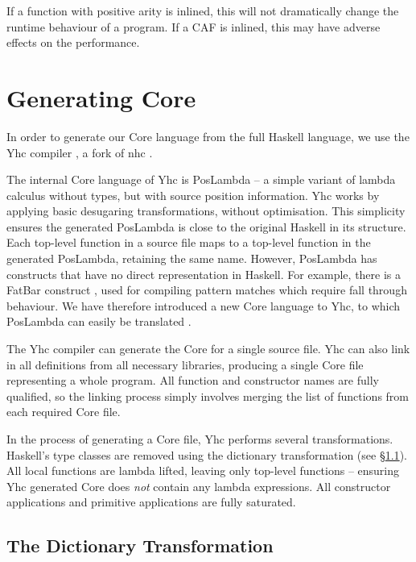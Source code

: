If a function with positive arity is inlined, this will not dramatically change the runtime behaviour of a program. If a CAF is inlined, this may have adverse effects on the performance.


\section{Generating Core}
\label{secB:generating_core}

In order to generate our Core language from the full Haskell language, we use the Yhc compiler \cite{yhc}, a fork of nhc \cite{nhc}.

The internal Core language of Yhc is PosLambda -- a simple variant of lambda calculus without types, but with source position information. Yhc works by applying basic desugaring transformations, without optimisation. This simplicity ensures the generated PosLambda is close to the original Haskell in its structure. Each top-level function in a source file maps to a top-level function in the generated PosLambda, retaining the same name. However, PosLambda has constructs that have no direct representation in Haskell. For example, there is a FatBar construct \cite{spj:implementation}, used for compiling pattern matches which require fall through behaviour. We have therefore introduced a new Core language to Yhc, to which PosLambda can easily be translated \cite{me:yhc_core}.

The Yhc compiler can generate the Core for a single source file. Yhc can also link in all definitions from all necessary libraries, producing a single Core file representing a whole program. All function and constructor names are fully qualified, so the linking process simply involves merging the list of functions from each required Core file.

In the process of generating a Core file, Yhc performs several transformations. Haskell's type classes are removed using the dictionary transformation (see \S\ref{secB:dictionary_transformation}). All local functions are lambda lifted, leaving only top-level functions -- ensuring Yhc generated Core does \textit{not} contain any lambda expressions. All constructor applications and primitive applications are fully saturated.


\subsection{The Dictionary Transformation}
\label{secB:dictionary_transformation}

